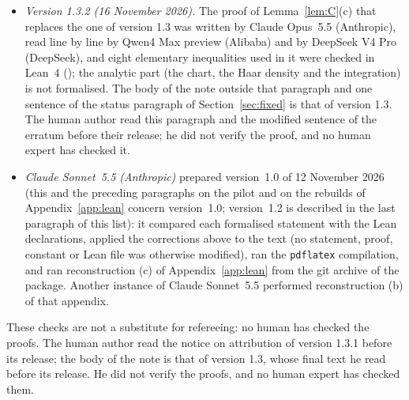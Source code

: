 \documentclass[11pt,a4paper]{article}
\theoremstyle{plain}
\theoremstyle{definition}
\theoremstyle{remark}
\numberwithin{equation}{section}
\newcommand{\VDATE}{16 November 2026}%
\begin{document}
\begin{itemize}
\item \emph{Version 1.3.2 (\VDATE).} The proof of Lemma~\ref{lem:C}(c) that replaces the one of version 1.3 was written by Claude Opus~5.5 (Anthropic), read line by line by Qwen4 Max preview (Alibaba) and by DeepSeek V4 Pro (DeepSeek), and eight elementary inequalities used in it were checked in Lean~4 (); the analytic part (the chart, the Haar density and the integration) is not formalised. The body of the note outside that paragraph and one sentence of the status paragraph of Section~\ref{sec:fixed} is that of version 1.3. The human author read this paragraph and the modified sentence of the erratum before their release; he did not verify the proof, and no human expert has checked it.
\item \emph{Claude Sonnet~5.5 (Anthropic)} prepared version~1.0 of 12 November 2026 (this and the preceding paragraphs on the pilot and on the rebuilds of Appendix~\ref{app:lean} concern version~1.0; version~1.2 is described in the last paragraph of this list): it compared each formalised statement with the Lean
declarations, applied the corrections above to the text (no statement, proof, constant or Lean file was otherwise modified), ran the
\texttt{pdflatex} compilation, and ran reconstruction (c) of Appendix~\ref{app:lean} from the git archive of the package. Another instance of Claude Sonnet~5.5 performed
reconstruction (b) of that appendix.
\end{itemize}
These checks are not a substitute for refereeing: no human has checked the proofs.
The human author read the notice on attribution of version 1.3.1 before its release; the body of the note is that of version 1.3, whose final text he read before its release. He did not verify the proofs, and no human expert has checked them.
\end{document}
